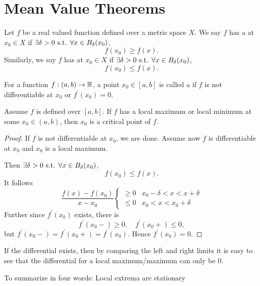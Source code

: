 \section{Mean Value Theorems}
\begin{definition}
Let $f$ be a real valued function defined over a metric space $X$. We say $f$ has a  at $x_0\in X$ if $\exists\delta>0\text{ s.t. }\forall x\in B_\delta(x_0)$,
\[ f(x_0)\ge f(x). \]
Similarly, we say $f$ has  at $x_0\in X$ if $\exists\delta>0\text{ s.t. }\forall x\in B_\delta(x_0)$,
\[ f(x_0)\le f(x). \]
\end{definition}

\begin{definition}
For a function $f:(a,b)\to\mathbb R$, a point $x_0\in[a,b]$ is called a  if $f$ is not differentiable at $x_0$ or $f^\prime(x_0)=0$.
\end{definition}

\begin{theorem}
Assume $f$ is defined over $[a,b]$. If $f$ has a local maximum or local minimum at some $x_0\in(a,b)$, then $x_0$ is a critical point of $f$.
\end{theorem}

\begin{proof}
If $f$ is not differentiable at $x_0$, we are done. Assume now $f$ is differentiable at $x_0$ and $x_0$ is a local maximum.

Then $\exists\delta>0\text{ s.t. }\forall x\in B_\delta(x_0)$,
\[ f(x_0)\le f(x). \]
It follows
\[ \frac{f(x)-f(x_0)}{x-x_0}\begin{cases}
\ge0 & x_0-\delta<x<x+\delta\\
\le0 & x_0<x<x_0+\delta
\end{cases} \]
Further since $f^\prime(x_0)$ exists, there is
\[ f^\prime(x_0-)\ge0, \quad f^\prime(x_0+)\le0, \]
but $f^\prime(x_0-)=f^\prime(x_0+)=f^\prime(x_0)$. Hence $f^\prime(x_0)=0.$
\end{proof}


\begin{theorem}
If the differential exists, then by comparing the left and right limits it is easy to see that the differential for a local maximum/maximum can only be $0$.

To summarize in four words: Local extrema are stationary
\end{theorem}

